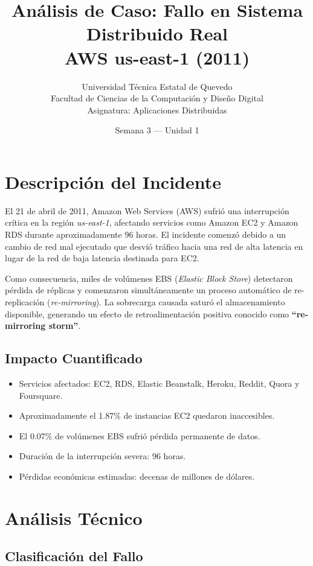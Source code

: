 \documentclass[10pt, a4paper]{article}
\title{\textbf{Análisis de Caso: Fallo en Sistema Distribuido Real\\AWS us-east-1 (2011)}}
\author{
Universidad Técnica Estatal de Quevedo\\
Facultad de Ciencias de la Computación y Diseño Digital\\
Asignatura: Aplicaciones Distribuidas
}
\date{Semana 3 --- Unidad 1}
\begin{document}
\maketitle
\vspace{-1cm}

\section{Descripción del Incidente}

El 21 de abril de 2011, Amazon Web Services (AWS) sufrió una interrupción crítica en la región \textit{us-east-1}, afectando servicios como Amazon EC2 y Amazon RDS durante aproximadamente 96 horas. El incidente comenzó debido a un cambio de red mal ejecutado que desvió tráfico hacia una red de alta latencia en lugar de la red de baja latencia destinada para EC2.

Como consecuencia, miles de volúmenes EBS (\textit{Elastic Block Store}) detectaron pérdida de réplicas y comenzaron simultáneamente un proceso automático de re-replicación (\textit{re-mirroring}). La sobrecarga causada saturó el almacenamiento disponible, generando un efecto de retroalimentación positiva conocido como \textbf{``re-mirroring storm''}.

\subsection*{Impacto Cuantificado}

\begin{itemize}[noitemsep]
    \item Servicios afectados: EC2, RDS, Elastic Beanstalk, Heroku, Reddit, Quora y Foursquare.
    \item Aproximadamente el 1.87\% de instancias EC2 quedaron inaccesibles.
    \item El 0.07\% de volúmenes EBS sufrió pérdida permanente de datos.
    \item Duración de la interrupción severa: 96 horas.
    \item Pérdidas económicas estimadas: decenas de millones de dólares.
\end{itemize}

\section{Análisis Técnico}

\subsection{Clasificación del Fallo}
\end{document}

